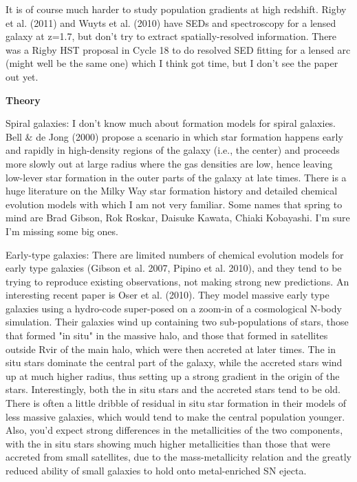 \documentclass{emulateapj}
\begin{document}
It is of course much harder to study population gradients at high
redshift.  Rigby et al. (2011) and Wuyts et al. (2010) have SEDs and
spectroscopy for a lensed galaxy at z=1.7, but don't try to extract
spatially-resolved information.  There was a Rigby HST proposal in
Cycle 18 to do resolved SED fitting for a lensed arc (might well be
the same one) which I think got time, but I don't see the paper out
yet.

{\bf Theory}

Spiral galaxies: I don't know much about formation models for spiral
galaxies.  Bell \& de Jong (2000) propose a scenario in which star
formation happens early and rapidly in high-density regions of the
galaxy (i.e., the center) and proceeds more slowly out at large radius
where the gas densities are low, hence leaving low-lever star
formation in the outer parts of the galaxy at late times.  There is a
huge literature on the Milky Way star formation history and detailed
chemical evolution models with which I am not very familiar.  Some
names that spring to mind are Brad Gibson, Rok Roskar, Daisuke Kawata,
Chiaki Kobayashi.  I'm sure I'm missing some big ones.

Early-type galaxies: There are limited numbers of chemical evolution
models for early type galaxies (Gibson et al. 2007, Pipino et
al. 2010), and they tend to be trying to reproduce existing
observations, not making strong new predictions.  An interesting
recent paper is Oser et al. (2010).  They model massive early type
galaxies using a hydro-code super-posed on a zoom-in of a cosmological
N-body simulation.  Their galaxies wind up containing two
sub-populations of stars, those that formed "in situ" in the massive
halo, and those that formed in satellites outside Rvir of the main
halo, which were then accreted at later times.  The in situ stars
dominate the central part of the galaxy, while the accreted stars wind
up at much higher radius, thus setting up a strong gradient in the
origin of the stars.  Interestingly, both the in situ stars and the
accreted stars tend to be old.  There is often a little dribble of
residual in situ star formation in their models of less massive
galaxies, which would tend to make the central population younger.
Also, you'd expect strong differences in the metallicities of the two
components, with the in situ stars showing much higher metallicities
than those that were accreted from small satellites, due to the
mass-metallicity relation and the greatly reduced ability of small
galaxies to hold onto metal-enriched SN ejecta.
\end{document}

